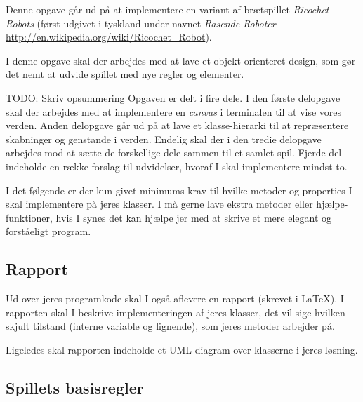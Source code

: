 


\newcommand*{\TODO}[1]{\textsf{TODO: #1}}

Denne opgave går ud på at implementere en variant af brætspillet
\emph{Ricochet Robots} (først udgivet i tyskland under navnet
\emph{Rasende Roboter}
\url{http://en.wikipedia.org/wiki/Ricochet_Robot}).

I denne opgave skal der arbejdes med at lave et objekt-orienteret
design, som gør det nemt at udvide spillet med nye regler og elementer.

\TODO{Skriv opsummering} Opgaven er delt i fire dele. I den første delopgave skal der arbejdes
med at implementere en \emph{canvas} i terminalen til at vise vores
verden. Anden delopgave går ud på at lave et klasse-hierarki til at
repræsentere skabninger og genstande i verden. Endelig skal der i den
tredie delopgave arbejdes mod at sætte de forskellige dele sammen til
et samlet spil. Fjerde del indeholde en række forslag til udvidelser,
hvoraf I skal implementere mindst to.

I det følgende er der kun givet minimums-krav til hvilke metoder og
properties I skal implementere på jeres klasser. I må gerne lave
ekstra metoder eller hjælpe-funktioner, hvis I synes det kan hjælpe
jer med at skrive et mere elegant og forståeligt program.


\subsection*{Rapport}


Ud over jeres programkode skal I også aflevere en rapport (skrevet i
\LaTeX). I rapporten skal I beskrive implementeringen af jeres
klasser, det vil sige hvilken skjult tilstand (interne variable og
lignende), som jeres metoder arbejder på.

Ligeledes skal rapporten indeholde et UML diagram over klasserne i
jeres løsning.

\subsection*{Spillets basisregler}
\label{sec:spillets-basisregler}

